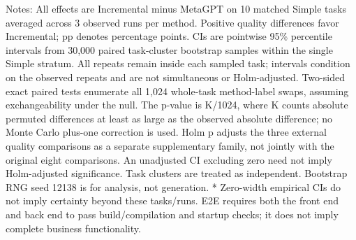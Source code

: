 \par\smallskip
\begin{minipage}{\linewidth}
\footnotesize Notes: All effects are Incremental minus MetaGPT on 10 matched Simple tasks averaged across 3 observed runs per method. Positive quality differences favor Incremental; pp denotes percentage points. CIs are pointwise 95\% percentile intervals from 30,000 paired task-cluster bootstrap samples within the single Simple stratum. All repeats remain inside each sampled task; intervals condition on the observed repeats and are not simultaneous or Holm-adjusted. Two-sided exact paired tests enumerate all 1,024 whole-task method-label swaps, assuming exchangeability under the null. The p-value is K/1024, where K counts absolute permuted differences at least as large as the observed absolute difference; no Monte Carlo plus-one correction is used. Holm p adjusts the three external quality comparisons as a separate supplementary family, not jointly with the original eight comparisons. An unadjusted CI excluding zero need not imply Holm-adjusted significance. Task clusters are treated as independent. Bootstrap RNG seed 12138 is for analysis, not generation. * Zero-width empirical CIs do not imply certainty beyond these tasks/runs. E2E requires both the front end and back end to pass build/compilation and startup checks; it does not imply complete business functionality.
\end{minipage}
